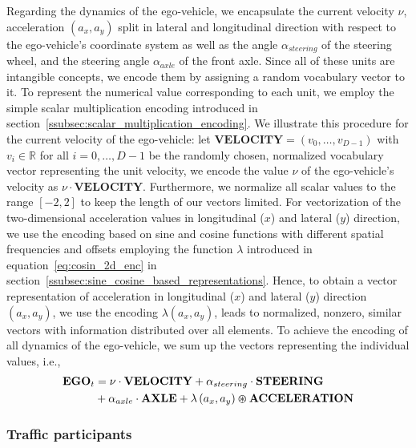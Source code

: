 Regarding the dynamics of the ego-vehicle, we encapsulate the current velocity $\nu$, acceleration $(a_x, a_y)$ split in lateral and longitudinal direction with respect to the ego-vehicle's coordinate system  as well as the angle $\alpha_{steering}$ of the steering wheel, and the steering angle $\alpha_{axle}$ of the front axle.
Since all of these units are intangible concepts, we encode them by assigning a random vocabulary vector to it.
To represent the numerical value corresponding to each unit, we employ the simple scalar multiplication encoding introduced in section~\ref{ssubsec:scalar_multiplication_encoding}.
We illustrate this procedure for the current velocity of the ego-vehicle: let $ \mathbf{VELOCITY} = \left(v_0, \ldots, v_{D-1}\right)$ with $v_i \in \mathbb{R}$ for all $i=0, \ldots, D-1$ be the randomly chosen, normalized vocabulary vector representing the unit velocity, we encode the value $\nu$ of the ego-vehicle's velocity as $\nu \cdot \mathbf{VELOCITY}$.
Furthermore, we normalize all scalar values to the range $\left[-2,2\right]$ to keep the length of our vectors limited.
For vectorization of the two-dimensional acceleration values in longitudinal ($x$) and lateral ($y$) direction, we use the encoding based on sine and cosine functions with different spatial frequencies and offsets employing the function $\lambda$ introduced in equation~\eqref{eq:cosin_2d_enc} in section~\ref{ssubsec:sine_cosine_based_representations}.
Hence, to obtain a vector representation of acceleration in longitudinal ($x$) and lateral ($y$) direction $(a_x, a_y)$, we use the encoding $\lambda\left(a_x, a_y\right)$, leads to normalized, nonzero, similar vectors with information distributed over all elements.
To achieve the encoding of all dynamics of the ego-vehicle, we sum up the vectors representing the individual values, i.e.,
\begin{align}
\label{eq:ego_dynamics}
\mathbf{EGO}_{t} &= \nu \cdot \mathbf{VELOCITY} + \alpha_{steering} \cdot\mathbf{STEERING} \nonumber \\
             &+ \alpha_{axle} \cdot\mathbf{AXLE} + \lambda\left(a_x, a_y\right) \varoast \mathbf{ACCELERATION}
\end{align}
\subsubsection{Traffic participants}%
\label{ssubsec:traffic_participants_context_class}

